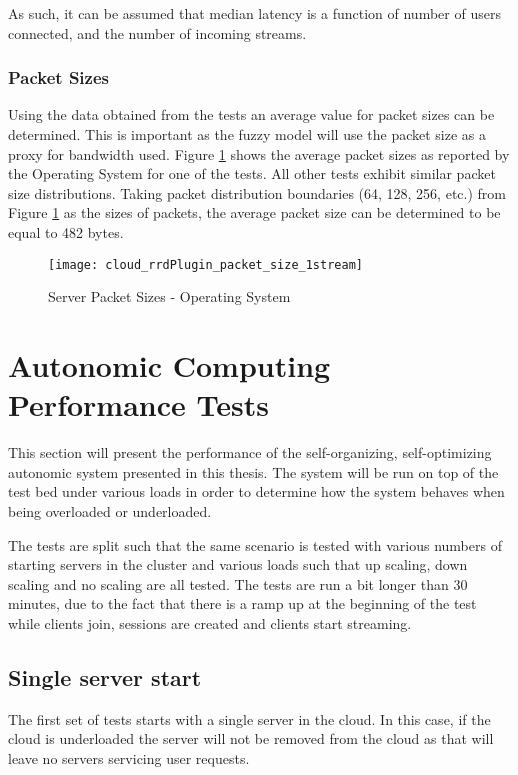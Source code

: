 As such, it can be assumed that median latency is a function of number of users connected, and the number of incoming streams.

\subsubsection{Packet Sizes}

Using the data obtained from the tests an average value for packet sizes can be determined. This is important as the fuzzy model will use the packet size as a proxy for bandwidth used. Figure \ref{fig:1serv1streampacketsizes} shows the average packet sizes as reported by the Operating System for one of the tests. All other tests exhibit similar packet size distributions. Taking packet distribution boundaries (64, 128, 256, etc.) from Figure \ref{fig:1serv1streampacketsizes} as the sizes of packets, the average packet size can be determined to be equal to 482 bytes.

\begin{figure}
	\centering
		\texttt{[image: cloud\_rrdPlugin\_packet\_size\_1stream]}
	\caption{Server Packet Sizes - Operating System}
	\label{fig:1serv1streampacketsizes}
\end{figure}

\section{Autonomic Computing Performance Tests}

This section will present the performance of the self-organizing, self-optimizing autonomic system presented in this thesis. The system will be run on top of the test bed under various loads in order to determine how the system behaves when being overloaded or underloaded.

The tests are split such that the same scenario is tested with various numbers of starting servers in the cluster and various loads such that up scaling, down scaling and no scaling are all tested. The tests are run a bit longer than 30 minutes, due to the fact that there is a ramp up at the beginning of the test while clients join, sessions are created and clients start streaming.

\subsection{Single server start}

The first set of tests starts with a single server in the cloud. In this case, if the cloud is underloaded the server will not be removed from the cloud as that will leave no servers servicing user requests.

